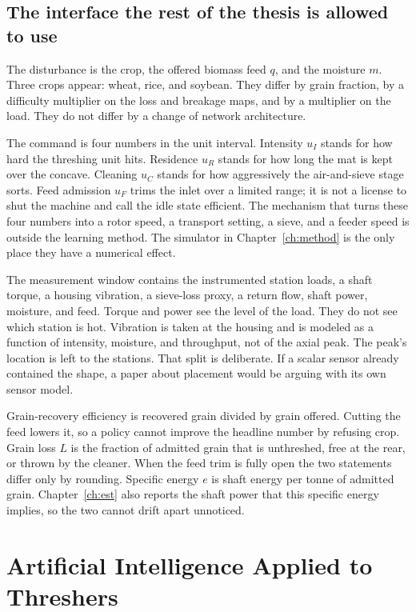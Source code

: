 \subsection{The interface the rest of the thesis is allowed to use}

The disturbance is the crop, the offered biomass feed \(q\), and the moisture \(m\). Three crops appear: wheat, rice, and soybean. They differ by grain fraction, by a difficulty multiplier on the loss and breakage maps, and by a multiplier on the load. They do not differ by a change of network architecture.

The command is four numbers in the unit interval. Intensity \(u_I\) stands for how hard the threshing unit hits. Residence \(u_R\) stands for how long the mat is kept over the concave. Cleaning \(u_C\) stands for how aggressively the air-and-sieve stage sorts. Feed admission \(u_F\) trims the inlet over a limited range; it is not a license to shut the machine and call the idle state efficient. The mechanism that turns these four numbers into a rotor speed, a transport setting, a sieve, and a feeder speed is outside the learning method. The simulator in Chapter~\ref{ch:method} is the only place they have a numerical effect.

The measurement window contains the instrumented station loads, a shaft torque, a housing vibration, a sieve-loss proxy, a return flow, shaft power, moisture, and feed. Torque and power see the level of the load. They do not see which station is hot. Vibration is taken at the housing and is modeled as a function of intensity, moisture, and throughput, not of the axial peak. The peak's location is left to the stations. That split is deliberate. If a scalar sensor already contained the shape, a paper about placement would be arguing with its own sensor model.

Grain-recovery efficiency is recovered grain divided by grain offered. Cutting the feed lowers it, so a policy cannot improve the headline number by refusing crop. Grain loss \(L\) is the fraction of admitted grain that is unthreshed, free at the rear, or thrown by the cleaner. When the feed trim is fully open the two statements differ only by rounding. Specific energy \(e\) is shaft energy per tonne of admitted grain. Chapter~\ref{ch:est} also reports the shaft power that this specific energy implies, so the two cannot drift apart unnoticed.

\section{Artificial Intelligence Applied to Threshers}
\label{sec:review}

